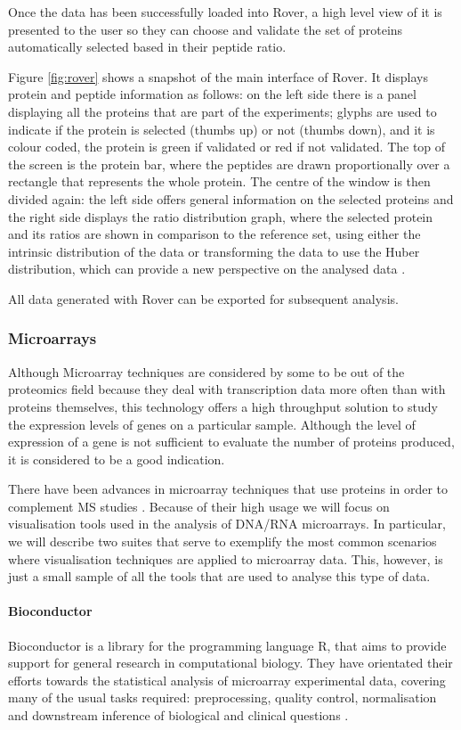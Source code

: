 Once the data has been successfully loaded into Rover, a high level view of it is presented to the user so they can choose and validate the set of proteins automatically selected based in their peptide ratio. 

Figure \ref{fig:rover} shows a snapshot of the main interface of Rover. It displays protein and peptide information as follows: on the left side there is a panel displaying all the proteins that are part of the experiments; glyphs are used to indicate if the protein is selected (thumbs up) or not (thumbs down), and it is colour coded, the protein is green if validated or red if not validated. The top of the screen is the protein bar, where the peptides are drawn proportionally over a rectangle that represents the whole protein. The centre of the window is then divided again: the left side offers general information on the selected proteins and the right side displays the ratio distribution graph, where the selected protein and its ratios are shown in comparison to the reference set, using either the intrinsic distribution of the data or transforming the data to use the Huber distribution, which can provide a new perspective on the analysed data \cite{COL2010}.

All data generated with Rover can be exported for subsequent analysis.

\subsubsection{Microarrays}
Although Microarray techniques are considered by some to be out of the proteomics field because they deal with transcription data more often than with proteins themselves, this technology offers a high throughput solution to study the expression levels of genes on a particular sample. Although the level of expression of a gene is not sufficient to evaluate the number of proteins produced, it is considered to be a good indication.

There have been advances in microarray techniques that use proteins in order to complement MS studies \cite{PRA2014}. Because of their high usage we will focus on visualisation tools used in the analysis of DNA/RNA microarrays. In particular, we will describe two suites that serve to exemplify the most common scenarios where visualisation techniques are applied to microarray data. This, however, is just a small sample of all the tools that are used to analyse this type of data.

\paragraph{Bioconductor}
Bioconductor is a library for the programming language R, that aims to provide support for general research in computational biology. They have orientated their efforts towards the statistical analysis of microarray experimental data, covering many of the usual tasks required: preprocessing, quality control, normalisation and downstream inference of biological and clinical questions \cite{GEN2004}.

